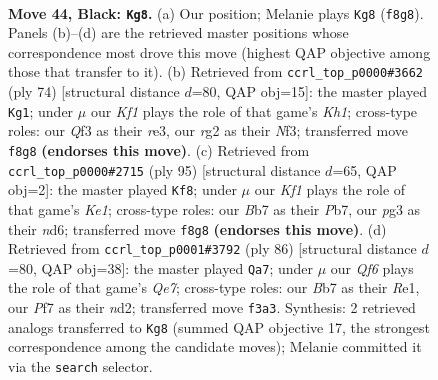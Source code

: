 \documentclass[11pt]{article}
\begin{document}
\clearpage

\begin{figure}[p]\centering
\begin{subfigure}{0.46\textwidth}\centering
\resizebox{\linewidth}{!}{%
\newchessgame
\chessboard[
  setfen={5k2/1b3p2/5np1/7p/8/5qP1/1R4RP/5NK1 b - - 1 44},
  showmover=false,
  pgfstyle=straightmove, color=movearrow, markmove={f8-g8}
]}
\caption{}
\end{subfigure}\hfill
\begin{subfigure}{0.46\textwidth}\centering
\resizebox{\linewidth}{!}{%
\newchessgame
\chessboard[
  setfen={7k/6pp/1p1bp3/1P1n4/6Q1/4rNP1/7P/7K w - - 13 38},
  showmover=false,
  pgfstyle=straightmove, color=movearrow, markmove={h1-g1}
]}
\caption{}
\end{subfigure}
\\[4pt]
\begin{subfigure}{0.46\textwidth}\centering
\resizebox{\linewidth}{!}{%
\newchessgame
\chessboard[
  setfen={4k3/1p5p/1q1N2n1/p7/2R3P1/P7/1P1R3P/7K b - - 13 48},
  showmover=false,
  pgfstyle=straightmove, color=movearrow, markmove={e8-f8}
]}
\caption{}
\end{subfigure}\hfill
\begin{subfigure}{0.46\textwidth}\centering
\resizebox{\linewidth}{!}{%
\newchessgame
\chessboard[
  setfen={5rk1/4Qp2/3N2p1/3P3n/5r2/p6P/3n2PK/4R3 w - - 0 44},
  showmover=false,
  pgfstyle=straightmove, color=movearrow, markmove={e7-a7}
]}
\caption{}
\end{subfigure}
\caption{\textbf{Move 44, Black: \texttt{Kg8}.} (a) Our position; Melanie plays \texttt{Kg8} (\texttt{f8g8}). Panels (b)--(d) are the retrieved master positions whose correspondence most drove this move (highest QAP objective among those that transfer to it). (b) Retrieved from \texttt{ccrl\_top\_p0000\#3662} (ply 74) [structural distance $d$=80, QAP obj=15]: the master played \texttt{Kg1}; under $\mu$ our \emph{Kf1} plays the role of that game's \emph{Kh1}; cross-type roles: our \emph{Q}f3 as their \emph{r}e3, our \emph{r}g2 as their \emph{N}f3; transferred move \texttt{f8g8} \textbf{(endorses this move)}. (c) Retrieved from \texttt{ccrl\_top\_p0000\#2715} (ply 95) [structural distance $d$=65, QAP obj=2]: the master played \texttt{Kf8}; under $\mu$ our \emph{Kf1} plays the role of that game's \emph{Ke1}; cross-type roles: our \emph{B}b7 as their \emph{P}b7, our \emph{p}g3 as their \emph{n}d6; transferred move \texttt{f8g8} \textbf{(endorses this move)}. (d) Retrieved from \texttt{ccrl\_top\_p0001\#3792} (ply 86) [structural distance $d$=80, QAP obj=38]: the master played \texttt{Qa7}; under $\mu$ our \emph{Qf6} plays the role of that game's \emph{Qe7}; cross-type roles: our \emph{B}b7 as their \emph{R}e1, our \emph{P}f7 as their \emph{n}d2; transferred move \texttt{f3a3}. Synthesis: 2 retrieved analogs transferred to \texttt{Kg8} (summed QAP objective 17, the strongest correspondence among the candidate moves); Melanie committed it via the \texttt{search} selector.}
\label{fig:thought-m87}
\end{figure}
\end{document}
